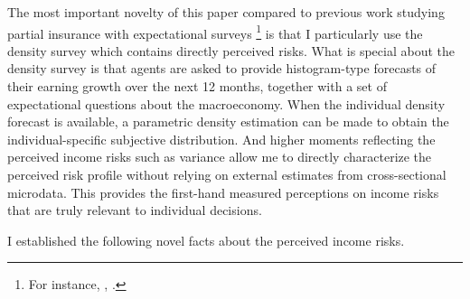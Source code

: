 The most important novelty of this paper compared to previous work studying partial insurance with expectational surveys \footnote{For instance, \cite{pistaferri_superior_2001}, \cite{kaufmann_disentangling_2009}.} is that I particularly use the density survey which contains directly perceived risks.  What is special about the density survey is that agents are asked to provide histogram-type forecasts of their earning growth over the next 12 months, together with a set of expectational questions about the macroeconomy. When the individual density forecast is available, a parametric density estimation can be made to obtain the individual-specific subjective distribution. And higher moments reflecting the perceived income risks such as variance allow me
to directly characterize the perceived risk profile without relying on external estimates from cross-sectional microdata. This provides the first-hand measured perceptions on income risks that are truly relevant to individual decisions.

I established the following novel facts about the perceived income risks.


